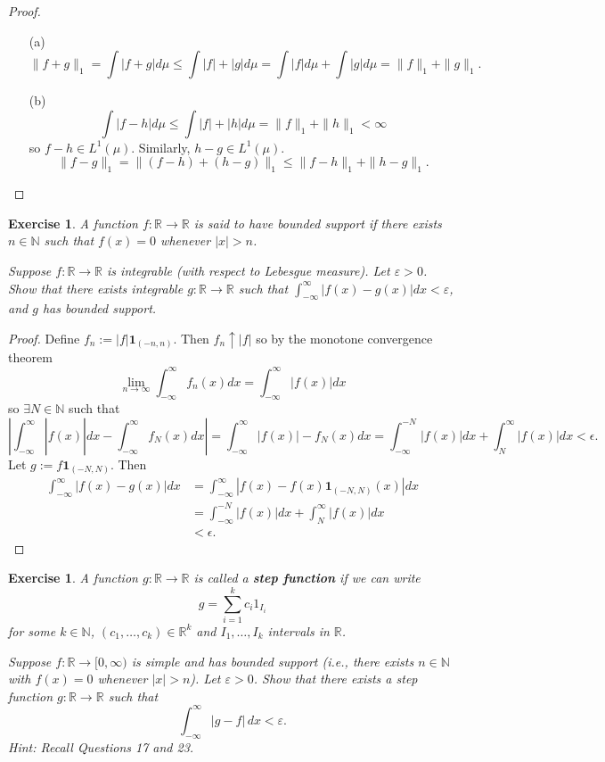 \documentclass{article}
\newtheorem{exercise}[theorem]{Exercise}
\begin{document}
\begin{proof}
\begin{enumerate}
    \item[(a)] \[\|f+g\|_1=\int|f+g|d\mu\leq\int|f|+|g|d\mu=\int|f|d\mu+\int|g|d\mu=\|f\|_1+\|g\|_1.\]
    \item[(b)] \[\int|f-h|d\mu\leq\int|f|+|h|d\mu=\|f\|_1+\|h\|_1<\infty\] so $f-h\in L^1(\mu)$. Similarly, $h-g\in L^1(\mu)$.\[\|f-g\|_1=\|(f-h)+(h-g)\|_1\leq\|f-h\|_1+\|h-g\|_1.\]
\end{enumerate}
\end{proof}
\begin{exercise}
A function \( f : \mathbb{R} \to \mathbb{R} \) is said to have \textit{bounded support} if there exists \( n \in \mathbb{N} \) such that \( f(x) = 0 \) whenever \( |x| > n \).
    
    Suppose \( f : \mathbb{R} \to \mathbb{R} \) is integrable (with respect to Lebesgue measure). Let \( \varepsilon > 0 \). Show that there exists integrable \( g : \mathbb{R} \to \mathbb{R} \) such that \( \int_{-\infty}^{\infty} |f(x) - g(x)|dx < \varepsilon \), and \( g \) has bounded support.
\end{exercise}
\begin{proof}
Define $f_n:=|f|\mathbf{1}_{(-n,n)}$. Then $f_n\uparrow |f|$ so by the monotone convergence theorem \[\lim_{n\to\infty}\int_{-\infty}^\infty f_n(x)dx=\int_{-\infty}^\infty |f(x)|dx\] so $\exists N\in\mathbb{N}$ such that \[|\int_{-\infty}^\infty|f(x)|dx-\int_{-\infty}^\infty f_N(x)dx|=\int_{-\infty}^\infty |f(x)|-f_N(x)dx=\int_{-\infty}^{-N}|f(x)|dx+\int_{N}^\infty|f(x)|dx<\epsilon.\] Let $g:=f\mathbf{1}_{(-N,N)}$. Then \begin{align*}\int_{-\infty}^\infty|f(x)-g(x)|dx&=\int_{-\infty}^\infty|f(x)-f(x)\mathbf{1}_{(-N,N)}(x)|dx\\&=\int_{-\infty}^{-N}|f(x)|dx+\int_{N}^\infty|f(x)|dx\\&<\epsilon.\end{align*}
\end{proof}
\begin{exercise}
A function \( g : \mathbb{R} \to \mathbb{R} \) is called a \textbf{step function} if we can write 
\[
g = \sum_{i=1}^{k} c_i 1_{I_i}
\]
for some \( k \in \mathbb{N} \), \( (c_1, \dots, c_k) \in \mathbb{R}^k \) and \( I_1, \dots, I_k \) intervals in \( \mathbb{R} \).

\smallskip
Suppose \( f : \mathbb{R} \to [0, \infty) \) is simple and has bounded support (i.e., there exists \( n \in \mathbb{N} \) with \( f(x) = 0 \) whenever \( |x| > n \)). Let \( \varepsilon > 0 \). Show that there exists a step function \( g : \mathbb{R} \to \mathbb{R} \) such that 
\[
\int_{-\infty}^{\infty} |g - f| \,dx < \varepsilon.
\]
\textit{Hint: Recall Questions 17 and 23.}
\end{exercise}
\end{document}

